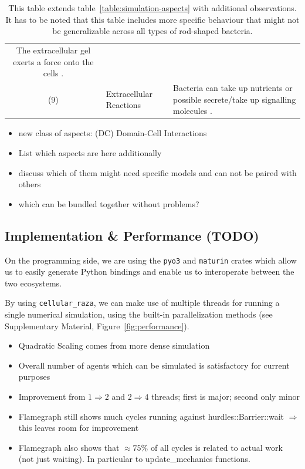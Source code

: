 \documentclass[10pt,letterpaper]{article}
\begin{document}
\begin{table}[H]
\begin{tabularx}{\textwidth}{c l X}
            The extracellular gel exerts a force onto the cells \cite{Grant2014}.\\
        (9) & Extracellular Reactions &
            Bacteria can take up nutrients or possible secrete/take up signalling molecules
            \cite{Li2025}.\\
        \bottomrule
    \end{tabularx}
    \label{table:simulation-aspects-supplement}
    \caption{
        This table extends table~\ref{table:simulation-aspects} with additional observations.
        It has to be noted that this table includes more specific behaviour that might not be
        generalizable across all types of rod-shaped bacteria.
    }
\end{table}

\begin{itemize}
    \item new class of aspects: (DC) Domain-Cell Interactions
    \item List which aspects are here additionally
    \item discuss which of them might need specific models and can not be paired with others
    \item which can be bundled together without problems?
\end{itemize}

\subsection{Implementation \& Performance (TODO)}
\label{section:supplement-performance}

On the programming side, we are using the \texttt{pyo3} and \texttt{maturin} crates which allow us
to easily generate Python bindings and enable us to interoperate between the two ecosystems.

By using \texttt{cellular\_raza}, we can make use of multiple threads for running a single numerical
simulation, using the built-in parallelization methods (see Supplementary Material,
Figure~\ref{fig:performance}).

\begin{itemize}
    \item Quadratic Scaling comes from more dense simulation
    \item Overall number of agents which can be simulated is satisfactory for current purposes
    \item Improvement from $1 \Rightarrow 2$ and $2\Rightarrow4$ threads; first is major; second
        only minor
    \item Flamegraph still shows much cycles running against hurdles::Barrier::wait $\Rightarrow$
        this leaves room for improvement
    \item Flamegraph also shows that $\approx 75\%$ of all cycles is related to actual work (not
        just waiting).
        In particular to update\_mechanics functions.
\end{itemize}
\end{document}
